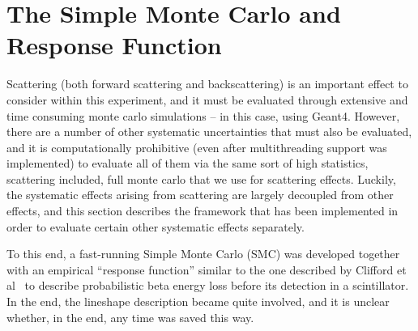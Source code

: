 

\FloatBarrier
\section{The Simple Monte Carlo and Response Function}
\label{sec:responsefunction}
Scattering (both forward scattering and backscattering) is an important effect to consider within this experiment, and it must be evaluated through extensive and time consuming monte carlo simulations -- in this case, using Geant4.  However, there are a number of other systematic uncertainties that must also be evaluated, and it is computationally prohibitive (even after multithreading support was implemented) to evaluate all of them via the same sort of high statistics, scattering included, full monte carlo that we use for scattering effects.  Luckily, the systematic effects arising from scattering are largely decoupled from other effects, and this section describes the framework that has been implemented in order to evaluate certain other systematic effects separately.  


To this end, a fast-running Simple Monte Carlo (SMC) was developed together with an empirical ``response function'' similar to the one described by Clifford et al~\cite{clifford} to describe probabilistic beta energy loss before its detection in a scintillator.  In the end, the lineshape description became quite involved, and it is unclear whether, in the end, any time was saved this way. 

